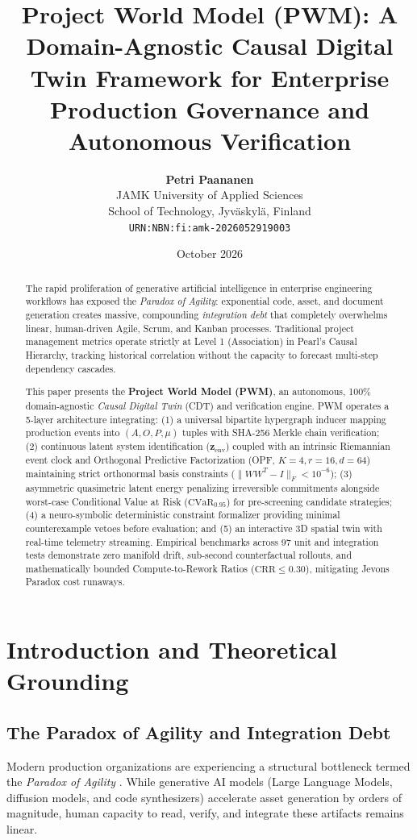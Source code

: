 \documentclass[11pt,a4paper]{article}
\title{\textbf{Project World Model (PWM): A Domain-Agnostic Causal Digital Twin Framework for Enterprise Production Governance and Autonomous Verification}}
\author{
    \textbf{Petri Paananen} \\
    JAMK University of Applied Sciences \\
    School of Technology, Jyv\"askyl\"a, Finland \\
    \texttt{URN:NBN:fi:amk-2026052919003}
}
\date{October 2026}
\begin{document}
\maketitle

\begin{abstract}
The rapid proliferation of generative artificial intelligence in enterprise engineering workflows has exposed the \emph{Paradox of Agility}: exponential code, asset, and document generation creates massive, compounding \emph{integration debt} that completely overwhelms linear, human-driven Agile, Scrum, and Kanban processes. Traditional project management metrics operate strictly at Level 1 (Association) in Pearl's Causal Hierarchy, tracking historical correlation without the capacity to forecast multi-step dependency cascades. 

This paper presents the \textbf{Project World Model (PWM)}, an autonomous, 100\% domain-agnostic \emph{Causal Digital Twin} (CDT) and verification engine. PWM operates a 5-layer architecture integrating: (1) a universal bipartite hypergraph inducer mapping production events into $(A, O, P, \mu)$ tuples with SHA-256 Merkle chain verification; (2) continuous latent system identification ($\mathbf{z}_{\text{env}}$) coupled with an intrinsic Riemannian event clock and Orthogonal Predictive Factorization (OPF, $K=4, r=16, d=64$) maintaining strict orthonormal basis constraints ($\|W W^T - I\|_F < 10^{-6}$); (3) asymmetric quasimetric latent energy penalizing irreversible commitments alongside worst-case Conditional Value at Risk ($\text{CVaR}_{0.95}$) for pre-screening candidate strategies; (4) a neuro-symbolic deterministic constraint formalizer providing minimal counterexample vetoes before evaluation; and (5) an interactive 3D spatial twin with real-time telemetry streaming. Empirical benchmarks across 97 unit and integration tests demonstrate zero manifold drift, sub-second counterfactual rollouts, and mathematically bounded Compute-to-Rework Ratios ($\text{CRR} \le 0.30$), mitigating Jevons Paradox cost runaways.
\end{abstract}

\section{Introduction and Theoretical Grounding}

\subsection{The Paradox of Agility and Integration Debt}
Modern production organizations are experiencing a structural bottleneck termed the \emph{Paradox of Agility} \cite{paananen2026}. While generative AI models (Large Language Models, diffusion models, and code synthesizers) accelerate asset generation by orders of magnitude, human capacity to read, verify, and integrate these artifacts remains linear. 
\end{document}
